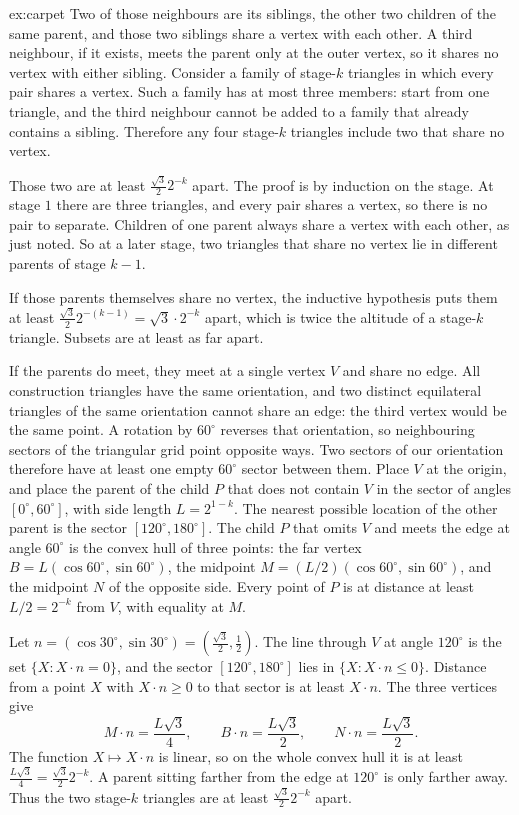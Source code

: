 \begin{solution}{ex:carpet}
Two of those neighbours are its siblings, the other two children of the same parent, and those two siblings share a vertex with each other.
A third neighbour, if it exists, meets the parent only at the outer vertex, so it shares no vertex with either sibling. Consider a family of
stage-$k$ triangles in which every pair shares a vertex. Such a family has at most three members: start from one triangle, and the third
neighbour cannot be added to a family that already contains a sibling. Therefore any four stage-$k$ triangles include two that share no
vertex.

Those two are at least $\frac{\sqrt 3}{2}2^{-k}$ apart. The proof is by induction on the stage. At stage $1$ there are three triangles, and
every pair shares a vertex, so there is no pair to separate. Children of one parent always share a vertex with each other, as just noted. So
at a later stage, two triangles that share no vertex lie in different parents of stage $k-1$.

If those parents themselves share no vertex, the inductive hypothesis puts them at least $\frac{\sqrt 3}{2}2^{-(k-1)}=\sqrt 3\cdot 2^{-k}$
apart, which is twice the altitude of a stage-$k$ triangle. Subsets are at least as far apart.

If the parents do meet, they meet at a single vertex $V$ and share no edge. All construction triangles have the same orientation, and two
distinct equilateral triangles of the same orientation cannot share an edge: the third vertex would be the same point. A rotation by
$60^\circ$ reverses that orientation, so neighbouring sectors of the triangular grid point opposite ways. Two sectors of our orientation
therefore have at least one empty $60^\circ$ sector between them. Place $V$ at the origin,
and place the parent of the child $P$ that does not contain $V$ in the sector of angles $[0^\circ,60^\circ]$, with side length
$L=2^{1-k}$. The nearest possible location of the other parent is the sector $[120^\circ,180^\circ]$. The child $P$ that omits $V$ and meets
the edge at angle $60^\circ$ is the convex hull of three points: the far vertex $B=L(\cos 60^\circ,\sin 60^\circ)$, the midpoint
$M=(L/2)(\cos 60^\circ,\sin 60^\circ)$, and the midpoint $N$ of the opposite side. Every point of $P$ is at distance at least $L/2=2^{-k}$
from $V$, with equality at $M$.

Let $n=(\cos 30^\circ,\sin 30^\circ)=(\frac{\sqrt 3}{2},\frac12)$. The line through $V$ at angle $120^\circ$ is the set $\{X:X\cdot n=0\}$, and
the sector $[120^\circ,180^\circ]$ lies in $\{X:X\cdot n\le 0\}$. Distance from a point $X$ with $X\cdot n\ge 0$ to that sector is at least
$X\cdot n$. The three vertices give
\[M\cdot n=\frac{L\sqrt 3}{4},\qquad B\cdot n=\frac{L\sqrt 3}{2},\qquad N\cdot n=\frac{L\sqrt 3}{2}.\]
The function $X\mapsto X\cdot n$ is linear, so on the whole convex hull it is at least $\frac{L\sqrt 3}{4}=\frac{\sqrt 3}{2}2^{-k}$. A parent
sitting farther from the edge at $120^\circ$ is only farther away. Thus the two stage-$k$ triangles are at least $\frac{\sqrt 3}{2}2^{-k}$
apart.


\end{solution}
